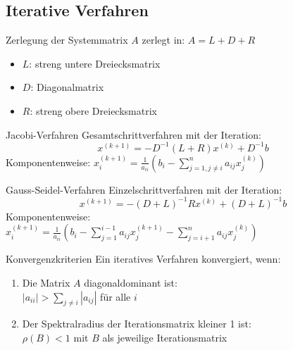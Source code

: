 \subsection{Iterative Verfahren}

\begin{definition}{Zerlegung der Systemmatrix} $A$ zerlegt in: $A = L + D + R$
\begin{itemize}
    \item $L$: streng untere Dreiecksmatrix
    \item $D$: Diagonalmatrix
    \item $R$: streng obere Dreiecksmatrix
\end{itemize}
\end{definition}

\begin{concept}{Jacobi-Verfahren}
Gesamtschrittverfahren mit der Iteration:
\vspace{-1mm}\\
$$x^{(k+1)} = -D^{-1}(L + R)x^{(k)} + D^{-1}b$$
\vspace{-1mm}
Komponentenweise:
$x_i^{(k+1)} = \frac{1}{a_{ii}}\left(b_i - \sum_{j=1,j\neq i}^n a_{ij}x_j^{(k)}\right)$
\end{concept}

\begin{concept}{Gauss-Seidel-Verfahren}
Einzelschrittverfahren mit der Iteration:
\vspace{-1mm}\\
$$x^{(k+1)} = -(D+L)^{-1}Rx^{(k)} + (D+L)^{-1}b$$
Komponentenweise:\\
$x_i^{(k+1)} = \frac{1}{a_{ii}}\left(b_i - \sum_{j=1}^{i-1} a_{ij}x_j^{(k+1)} - \sum_{j=i+1}^n a_{ij}x_j^{(k)}\right)$

\end{concept}

\begin{theorem}{Konvergenzkriterien}
Ein iteratives Verfahren konvergiert, wenn:
\begin{enumerate}
    \item Die Matrix $A$ diagonaldominant ist:\\
    $|a_{ii}| > \sum_{j\neq i} |a_{ij}|$ für alle $i$
    \item Der Spektralradius der Iterationsmatrix kleiner 1 ist:\\
    $\rho(B) < 1$ mit $B$ als jeweilige Iterationsmatrix
\end{enumerate}
\end{theorem}

